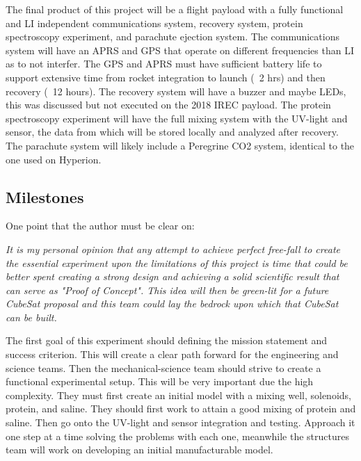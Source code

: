 \documentclass[conference]{IEEEtran} %
\begin{document}
  The final product of this project will be a flight payload with a fully functional and LI independent communications system, recovery system, protein spectroscopy experiment, and parachute ejection 
  system. The communications system will have an APRS and GPS that operate on different frequencies than LI as to not interfer. The GPS and APRS must have sufficient battery life 
  to support extensive time from rocket integration to launch (~2 hrs) and then recovery (~12 hours). The recovery system will have a buzzer and maybe LEDs, this was discussed 
  but not executed on the 2018 IREC payload. The protein spectroscopy experiment will have the full mixing system with the UV-light and sensor, the data from which will be stored 
  locally and analyzed after recovery. The parachute system will likely include a Peregrine CO2 system, identical to the one used on Hyperion. 

\subsection{Milestones}
\label{subsec:milestones}

  One point that the author must be clear on:

  \textit{It is my personal opinion that any attempt to achieve perfect free-fall to create the essential experiment upon the limitations of this project is time that 
  could be better spent creating a strong design and achieving a solid scientific result that can serve as "Proof of Concept". This idea will then be green-lit for a future 
  CubeSat proposal and this team could lay the bedrock upon which that CubeSat can be built.}

  The first goal of this experiment should defining the mission statement and success criterion. This will create a clear path forward for the engineering and science teams.
  Then the mechanical-science team should strive to create a functional experimental setup. This will be very important due the high complexity. They must first create an initial 
  model with a mixing well, solenoids, protein, and saline. They should first work to attain a good mixing of protein and saline. Then go onto the UV-light and sensor integration and testing. 
  Approach it one step at a time solving the problems with each one, meanwhile the structures team will work on developing an initial manufacturable model.
\end{document}
